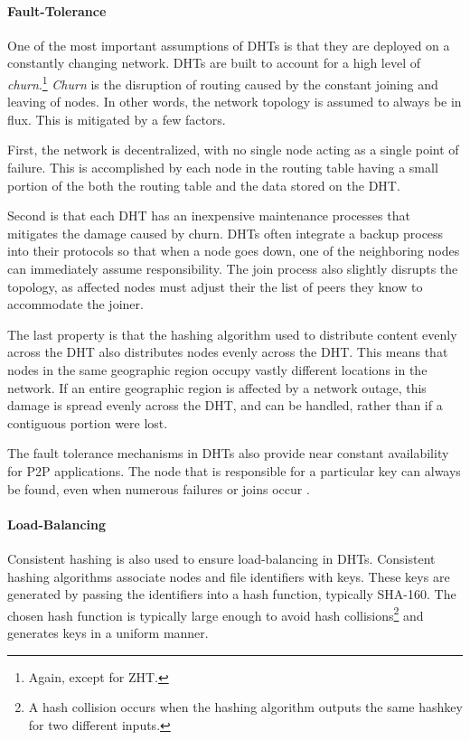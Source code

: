\paragraph{Fault-Tolerance}
One of the most important assumptions of DHTs is that they are deployed on a constantly changing network.
DHTs are built to account for a high level of \textit{churn}.\footnote{Again, except for ZHT.}  
\textit{Churn} is the disruption of routing caused by the constant joining and leaving of nodes.
In other words, the network topology is assumed to always be in flux.
This is mitigated by a few factors.

First, the network is decentralized, with no single node acting as a single point of failure.
This is accomplished by each node in the routing table having a small portion of the both the routing table and the data stored on the DHT.

Second is that each DHT has an inexpensive maintenance processes that mitigates the damage caused by churn.
DHTs often integrate a backup process into their protocols so that when a node goes down, one of the neighboring nodes can immediately assume responsibility.
The join process also slightly disrupts the topology, as affected nodes must adjust their the list of peers they know to accommodate the joiner. 

The last property is that the hashing algorithm used to distribute content evenly across the DHT also distributes nodes evenly across the DHT.  
This means that nodes in the same geographic region occupy vastly different locations in the network.  
If an entire geographic region is affected by a network outage, this damage is spread evenly across the DHT, and can be handled, rather than if a contiguous portion were lost.


The fault tolerance mechanisms in DHTs also provide near constant availability for P2P applications.
The node that is responsible for a particular key can always be found, even when numerous failures or joins occur \cite{chord}.


\paragraph{Load-Balancing}
Consistent hashing is also used to ensure load-balancing in DHTs.
Consistent hashing algorithms associate nodes and file identifiers with keys.  
These keys are generated by passing the identifiers into a hash function, typically SHA-160.
The chosen hash function is typically large enough to avoid hash collisions\footnote{A hash collision occurs when the hashing algorithm outputs the same hashkey for two different inputs.} and generates keys in a uniform manner. 

